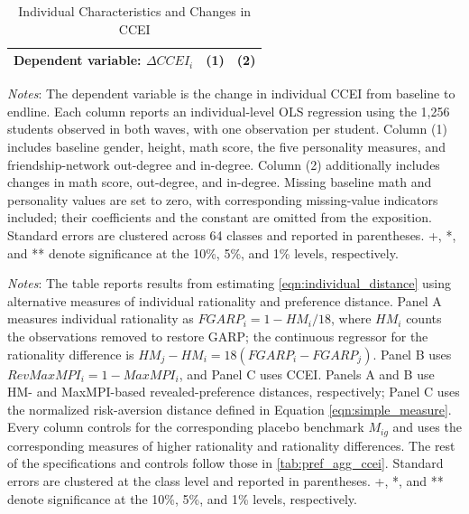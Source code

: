 \documentclass[11 pt]{article}
\begin{document}
\begin{table}[H]
\centering
\caption{Individual Characteristics and Changes in CCEI}
\label{tab:individual_ccei_change}
\begin{tabular}{lcc}
\toprule \hline
Dependent variable: $\Delta CCEI_i$ & (1) & (2) \\
\midrule

\end{tabular}
\begin{minipage}{\textwidth}
{\footnotesize \emph{Notes}: The dependent variable is the change in individual CCEI from baseline to endline. Each column reports an individual-level OLS regression using the 1,256 students observed in both waves, with one observation per student. Column (1) includes baseline gender, height, math score, the five personality measures, and friendship-network out-degree and in-degree. Column (2) additionally includes changes in math score, out-degree, and in-degree. Missing baseline math and personality values are set to zero, with corresponding missing-value indicators included; their coefficients and the constant are omitted from the exposition. Standard errors are clustered across 64 classes and reported in parentheses. +, *, and ** denote significance at the 10\%, 5\%, and 1\% levels, respectively.}
\end{minipage}
\end{table}

\begin{table}[H]
\centering
\singlespacing
\caption{Alternative Measures of Rationality and Preference Distance}
\label{tab:pref_agg_alternatives}
\begin{minipage}{\textwidth}
{\footnotesize \emph{Notes}: The table reports results from estimating \autoref{eqn:individual_distance} using alternative measures of individual rationality and preference distance. Panel A measures individual rationality as $FGARP_i=1-HM_i/18$, where $HM_i$ counts the observations removed to restore GARP; the continuous regressor for the rationality difference is $HM_j-HM_i=18(FGARP_i-FGARP_j)$. Panel B uses $RevMaxMPI_i=1-MaxMPI_i$, and Panel C uses CCEI. Panels A and B use HM- and MaxMPI-based revealed-preference distances, respectively; Panel C uses the normalized risk-aversion distance defined in Equation \eqref{eqn:simple_measure}. Every column controls for the corresponding placebo benchmark $M_{ig}$ and uses the corresponding measures of higher rationality and rationality differences. The rest of the specifications and controls follow those in \autoref{tab:pref_agg_ccei}. Standard errors are clustered at the class level and reported in parentheses. +, *, and ** denote significance at the 10\%, 5\%, and 1\% levels, respectively.}
\end{minipage}
\end{table}
\end{document}
